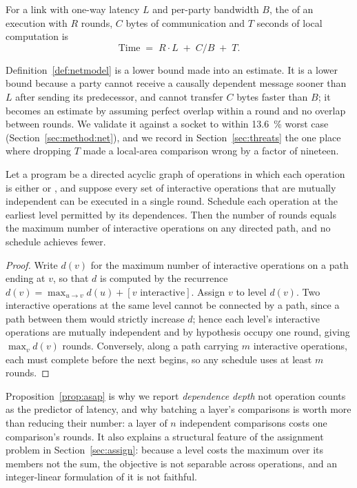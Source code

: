 \begin{definition}
\label{def:netmodel}
For a link with one-way latency $L$ and per-party bandwidth $B$, the
 of an execution with $R$ rounds, $C$ bytes of
communication and $T$ seconds of local computation is
\[
  \mathrm{Time} \;=\; R \cdot L \;+\; C / B \;+\; T .
\]
\end{definition}

Definition~\ref{def:netmodel} is a lower bound made into an estimate. It is a
lower bound because a party cannot receive a causally dependent message sooner
than $L$ after sending its predecessor, and cannot transfer $C$ bytes faster than
$B$; it becomes an estimate by assuming perfect overlap within a round and no
overlap between rounds. We validate it against a socket to within
\SI{13.6}{\percent} worst case (Section~\ref{sec:method:net}), and we record in
Section~\ref{sec:threats} the one place where dropping $T$ made a local-area
comparison wrong by a factor of nineteen.

\begin{proposition}
\label{prop:asap}
Let a program be a directed acyclic graph of operations in which each operation
is either  or , and suppose every set of interactive
operations that are mutually independent can be executed in a single round.
Schedule each operation at the earliest level permitted by its dependences. Then
the number of rounds equals the maximum number of interactive operations on any
directed path, and no schedule achieves fewer.
\end{proposition}

\begin{proof}
Write $d(v)$ for the maximum number of interactive operations on a path ending at
$v$, so that $d$ is computed by the recurrence $d(v) = \max_{u \to v} d(u) + [v
\text{ interactive}]$. Assign $v$ to level $d(v)$. Two interactive operations at
the same level cannot be connected by a path, since a path between them would
strictly increase $d$; hence each level's interactive operations are mutually
independent and by hypothesis occupy one round, giving $\max_v d(v)$ rounds.
Conversely, along a path carrying $m$ interactive operations, each must complete
before the next begins, so any schedule uses at least $m$ rounds.
\end{proof}

Proposition~\ref{prop:asap} is why we report \emph{dependence depth} not
operation counts as the predictor of latency, and why batching a layer's
comparisons is worth more than reducing their number: a layer of $n$ independent
comparisons costs one comparison's rounds. It also explains a structural feature
of the assignment problem in Section~\ref{sec:assign}: because a level costs the
maximum over its members not the sum, the objective is not separable
across operations, and an integer-linear formulation of it is not faithful.

